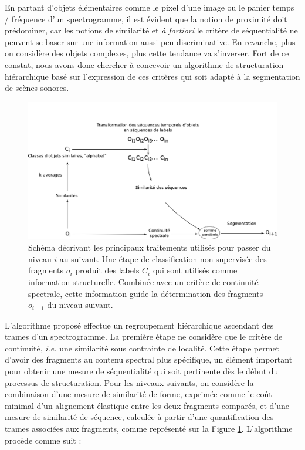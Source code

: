   En partant d'objets élémentaires comme le pixel d'une image ou le panier temps / fréquence d'un spectrogramme, il est évident que la notion de proximité doit prédominer, car les notions de similarité et \textit{à fortiori} le critère de séquentialité ne peuvent se baser sur une information aussi peu discriminative.  En revanche, plus on considère des objets complexes, plus cette tendance va s'inverser. Fort de ce constat, nous avons donc chercher à concevoir un algorithme de structuration hiérarchique basé sur l'expression de ces critères qui soit adapté à la segmentation de scènes sonores.~\cite{rossignolhal-01122006}

  \begin{figure}[t]
    \includegraphics[width=1\textwidth]{figures/alc_one_level.png}
    \caption{Schéma décrivant les principaux traitements utilisés pour passer du niveau $i$ au suivant. Une étape de classification non supervisée des fragments $o_i$ produit des labels $C_i$ qui sont utilisés comme information structurelle. Combinée avec un critère de continuité spectrale, cette information guide la détermination des fragments $o_{i+1}$ du niveau suivant.}\label{fig:alc}
  \end{figure}

  L'algorithme proposé effectue un regroupement hiérarchique ascendant des trames d'un spectrogramme. La première étape ne considère que le  critère de continuité, \textit{i.e.} une similarité sous contrainte de localité. Cette étape permet d'avoir des fragments au contenu spectral plus spécifique, un élément important pour obtenir une mesure de séquentialité qui soit pertinente dès le début du processus de structuration. Pour les niveaux suivants, on considère la combinaison d'une mesure de similarité de forme, exprimée comme le coût minimal d'un alignement élastique entre les deux fragments comparés, et d'une mesure de similarité de séquence, calculée à partir d'une quantification des trames associées aux fragments, comme représenté sur la Figure \ref{fig:alc}. L'algorithme procède comme suit :

